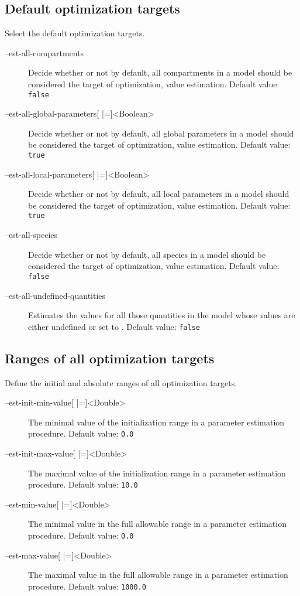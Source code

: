\subsection{Default optimization targets}
Select the default optimization targets.
\begin{description}
\item[--est-all-compartments]
          Decide whether or not by default, all compartments in a model
          should be considered the target of optimization, \ie value
          estimation.
          Default value: \texttt{false}
\item[--est-all-global-parameters{[} |={]}<Boolean>]
          Decide whether or not by default, all global parameters in a model
          should be considered the target of optimization, \ie value
          estimation.
          Default value: \texttt{true}
\item[--est-all-local-parameters{[} |={]}<Boolean>]
          Decide whether or not by default, all local parameters in a model
          should be considered the target of optimization, \ie value
          estimation.
          Default value: \texttt{true}
\item[--est-all-species]
          Decide whether or not by default, all species in a model should
          be considered the target of optimization, \ie value estimation.
          Default value: \texttt{false}
\item[--est-all-undefined-quantities]
          Estimates the values for all those quantities in the model whose
          values are either undefined or set to \NaN.
          Default value: \texttt{false}
\end{description}

\subsection{Ranges of all optimization targets}
Define the initial and absolute ranges of all optimization targets.
\begin{description}
\item[--est-init-min-value{[} |={]}<Double>]
          The minimal value of the initialization range in a parameter estimation procedure.
          Default value: \texttt{0.0}
\item[--est-init-max-value{[} |={]}<Double>]
          The maximal value of the initialization range in a parameter
          estimation procedure.
          Default value: \texttt{10.0}
\item[--est-min-value{[} |={]}<Double>]
          The minimal value in the full allowable range in a parameter
          estimation procedure.
          Default value: \texttt{0.0}
\item[--est-max-value{[} |={]}<Double>]
          The maximal value in the full allowable range in a parameter
          estimation procedure.
          Default value: \texttt{1000.0}
\end{description}


